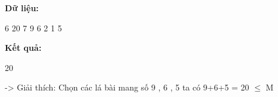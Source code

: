 \textbf{Dữ liệu: }

6 20 7 9 6 2 1 5

\textbf{Kết quả: }

20

-> Giải thích: Chọn các lá bài mang số 9 , 6 , 5 ta có 9+6+5 = 20  $\le$  M